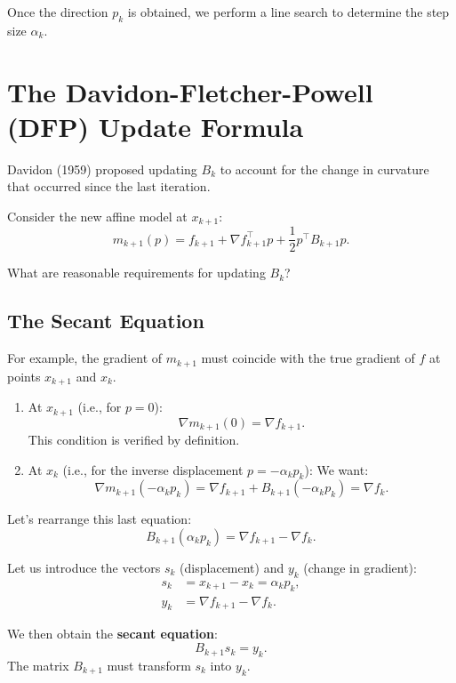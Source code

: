 Once the direction $p_k$ is obtained, we perform a line search to determine the step size $\alpha_k$.

\section{The Davidon-Fletcher-Powell (DFP) Update Formula}
\label{sec:dfp}

Davidon (1959) proposed updating $B_k$ to account for the change in curvature that occurred since the last iteration.

Consider the new affine model at $x_{k+1}$:
\begin{equation}
    m_{k+1}(p) = f_{k+1} + \nabla f_{k+1}^\top p + \frac{1}{2} p^\top B_{k+1} p.
\end{equation}

What are reasonable requirements for updating $B_k$?

\subsection{The Secant Equation}

For example, the gradient of $m_{k+1}$ must coincide with the true gradient of $f$ at points $x_{k+1}$ and $x_k$.

\begin{enumerate}
    \item At $x_{k+1}$ (i.e., for $p=0$):
    \[ \nabla m_{k+1}(0) = \nabla f_{k+1}. \]
    This condition is verified by definition.

    \item At $x_k$ (i.e., for the inverse displacement $p = -\alpha_k p_k$):
    We want:
    \begin{equation}
        \nabla m_{k+1}(-\alpha_k p_k) = \nabla f_{k+1} + B_{k+1}(-\alpha_k p_k) = \nabla f_k.
    \end{equation}
\end{enumerate}

Let's rearrange this last equation:
\[
    B_{k+1} (\alpha_k p_k) = \nabla f_{k+1} - \nabla f_k.
\]

Let us introduce the vectors $s_k$ (displacement) and $y_k$ (change in gradient):
\begin{align}
    s_k &= x_{k+1} - x_k = \alpha_k p_k, \\
    y_k &= \nabla f_{k+1} - \nabla f_k.
\end{align}

We then obtain the \textbf{secant equation}:
\begin{equation}
    \label{eq:secant}
    B_{k+1} s_k = y_k.
\end{equation}
The matrix $B_{k+1}$ must transform $s_k$ into $y_k$.

